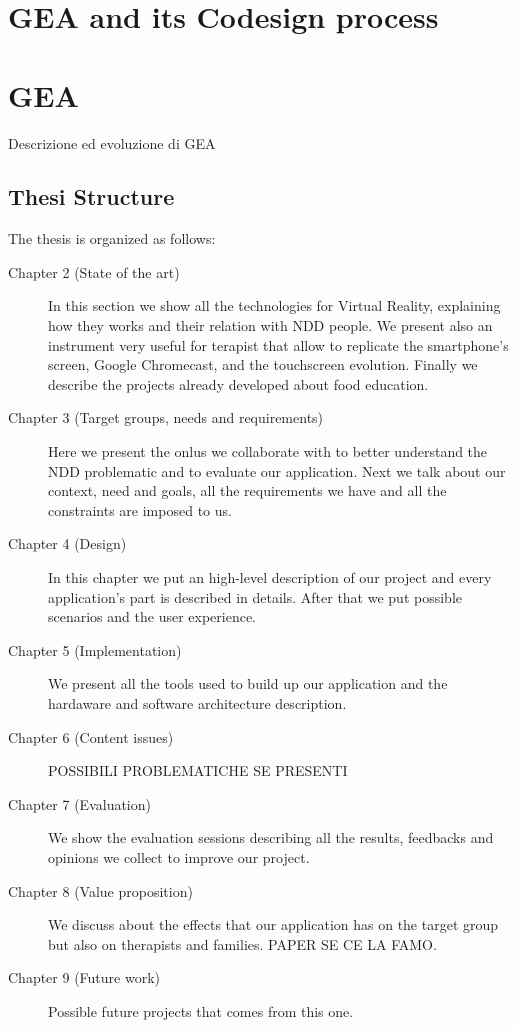 \section{GEA and its Codesign process}

\section{GEA}
Descrizione ed evoluzione di GEA
\subsection{Thesi Structure}
The thesis is organized as follows:
\begin{description}
\item[Chapter 2 (State of the art)] In this section we show all the technologies for Virtual Reality, explaining how they works and their relation with NDD people. We present also an instrument very useful for terapist that allow to replicate the smartphone's screen, Google Chromecast, and the touchscreen evolution. Finally we describe the projects already developed about food education.
\item[Chapter 3 (Target groups, needs and requirements)] Here we present the onlus we collaborate with to better understand the NDD problematic and to evaluate our application. Next we talk about our context, need and goals, all the requirements we have and all the constraints are imposed to us.
\item[Chapter 4 (Design)] In this chapter we put an high-level description of our project and every application's part is described in details. After that we put possible scenarios and the user experience. 
\item[Chapter 5 (Implementation)] We present all the tools used to build up our application and the hardaware and software architecture description.
\item[Chapter 6 (Content issues)]POSSIBILI PROBLEMATICHE SE PRESENTI
\item[Chapter 7 (Evaluation)] We show the evaluation sessions describing all the results, feedbacks and opinions we collect to improve our project.
\item[Chapter 8 (Value proposition)] We discuss about the effects that our application has on the target group but also on therapists and families. PAPER SE CE LA FAMO.
\item[Chapter 9 (Future work)] Possible future projects that comes from this one.
\end{description}
 
